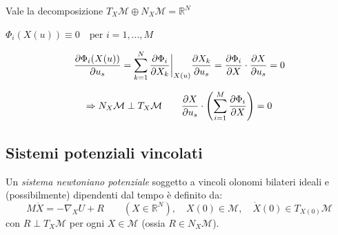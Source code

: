 \begin{remark}
    Vale la decomposizione $T_X \mathcal{M} \oplus N_X \mathcal{M} = \mathbb{R}^N$
\end{remark}

\begin{remark}
    $\Phi_i(X(u)) \equiv 0 \quad \text{per } i = 1, \dots, M$
\end{remark}

\begin{equation*}
    \pdv{\Phi_i(X(u))}{u_s} = \sum_{k=1}^N \pdv{\Phi_i}{X_k}\bigg|_{X(u)} \pdv{X_k}{u_s} = \pdv{\Phi_i}{X} \cdot \pdv{X}{u_s} = 0
\end{equation*}

\begin{equation*}
    \Rightarrow N_X \mathcal{M} \perp T_X \mathcal{M} \qquad 
    \pdv{X}{u_s} \cdot \left( \sum_{i=1}^M \pdv{\Phi_i}{X} \right) = 0
\end{equation*}


\subsection{Sistemi potenziali vincolati}

\begin{definition}
    Un \textit{sistema newtoniano potenziale} soggetto a vincoli olonomi bilateri ideali e (possibilmente) dipendenti dal tempo è definito da:
    \begin{equation*}
        M\ddot{X} = -\nabla_X U + R \qquad (X \in \mathbb{R}^N), \quad X(0) \in \mathcal{M}, \quad \dot{X}(0) \in T_{X(0)}\mathcal{M}
    \end{equation*}
    con $R \perp T_X \mathcal{M}$ per ogni $X \in \mathcal{M}$ (ossia $R \in N_X \mathcal{M}$).
\end{definition}

